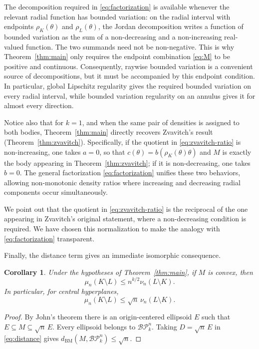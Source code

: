 \documentclass{amsart}
\newtheorem{corollary}[theorem]{Corollary}
\theoremstyle{remark}
\newcommand{\BP}{\mathcal{BP}}
\begin{document}
The decomposition required in \eqref{eq:factorization} is available whenever
the relevant radial function has bounded variation: on the radial interval
with endpoints $\rho_K(\theta)$ and $\rho_L(\theta)$, the Jordan decomposition
writes a function of bounded variation as the sum of a non-decreasing and a
non-increasing real-valued function. The two summands need not be
non-negative. This is why Theorem~\ref{thm:main} only requires the endpoint
combination \eqref{eq:M} to be positive and continuous. Consequently, raywise
bounded variation is a convenient source of decompositions, but it must be
accompanied by this endpoint condition. In particular, global Lipschitz
regularity gives the required bounded variation on every radial interval,
while bounded variation regularity on an annulus gives it for almost every
direction.

Notice also that for $k=1$, and when the same pair of densities is assigned to
both bodies, Theorem~\ref{thm:main} directly recovers Zvavitch's result
(Theorem~\ref{thm:zvavitch}). Specifically, if the quotient in
\eqref{eq:zvavitch-ratio} is non-increasing, one takes $a=0$, so that
$c(\theta)=b(\rho_K(\theta)\theta)$ and $M$ is exactly the body appearing in
Theorem~\ref{thm:zvavitch}; if it is non-decreasing, one takes $b=0$. The
general factorization \eqref{eq:factorization} unifies these two behaviors,
allowing non-monotonic density ratios where increasing and decreasing radial
components occur simultaneously.

We point out that the quotient in \eqref{eq:zvavitch-ratio} is the reciprocal
of the one appearing in Zvavitch's original statement, where a non-decreasing
condition is required. We have chosen this normalization to make the analogy
with \eqref{eq:factorization} transparent.

Finally, the distance term gives an immediate isomorphic consequence.

\begin{corollary}\label{cor:john}
Under the hypotheses of Theorem~\ref{thm:main}, if $M$ is convex, then
\[
 \mu_n(K\setminus L)\leq n^{k/2}\nu_n(L\setminus K).
\]
In particular, for central hyperplanes,
\[
 \mu_n(K\setminus L)\leq\sqrt n\,\nu_n(L\setminus K).
\]
\end{corollary}

\begin{proof}
By John's theorem there is an origin-centered ellipsoid $E$ such that
$E\subseteq M\subseteq\sqrt n\,E$. Every ellipsoid belongs to $\BP_k^n$.
Taking $D=\sqrt n\,E$ in \eqref{eq:distance} gives
$d_{\mathrm{BM}}(M,\BP_k^n)\leq\sqrt n$.
\end{proof}
\end{document}
